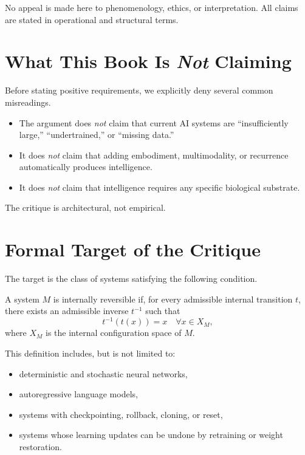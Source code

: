 \documentclass[11pt]{book}
\begin{document}
No appeal is made here to phenomenology, ethics, or interpretation. All
claims are stated in operational and structural terms.

\section{What This Book Is \emph{Not} Claiming}

Before stating positive requirements, we explicitly deny several common
misreadings.

\begin{itemize}
\item The argument does \emph{not} claim that current AI systems are
``insufficiently large,'' ``undertrained,'' or ``missing data.''
\item It does \emph{not} claim that adding embodiment, multimodality, or
recurrence automatically produces intelligence.
\item It does \emph{not} claim that intelligence requires any specific
biological substrate.
\end{itemize}

The critique is architectural, not empirical.

\section{Formal Target of the Critique}

The target is the class of systems satisfying the following condition.

\begin{definition}
A system $M$ is internally reversible if, for every admissible internal
transition $t$, there exists an admissible inverse $t^{-1}$ such that
\[
t^{-1}(t(x)) = x
\quad \forall x \in X_M,
\]
where $X_M$ is the internal configuration space of $M$.
\end{definition}

This definition includes, but is not limited to:
\begin{itemize}
\item deterministic and stochastic neural networks,
\item autoregressive language models,
\item systems with checkpointing, rollback, cloning, or reset,
\item systems whose learning updates can be undone by retraining or weight
restoration.
\end{itemize}
\end{document}
